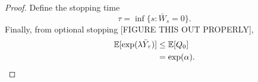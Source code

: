 \begin{proof}
	Define the stopping time 
	\begin{equation}
		\tau = \inf\{s: \bar{W}_s = 0\}.
	\end{equation}
	Finally, from optional stopping [FIGURE THIS OUT PROPERLY],
	\begin{align}
		\mathbb{E}[\exp(\lambda \bar{Y}_\tau )] &\leq \mathbb{E}[Q_{0}]\\
		&= \exp(\alpha).
	\end{align}
\end{proof}